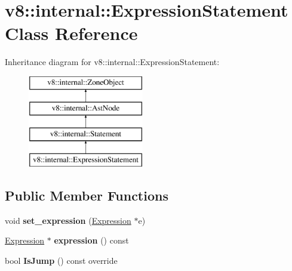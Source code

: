 \hypertarget{classv8_1_1internal_1_1_expression_statement}{}\section{v8\+:\+:internal\+:\+:Expression\+Statement Class Reference}
\label{classv8_1_1internal_1_1_expression_statement}
Inheritance diagram for v8\+:\+:internal\+:\+:Expression\+Statement\+:\begin{figure}[H]
\begin{center}
\leavevmode
\includegraphics[height=4.000000cm]{classv8_1_1internal_1_1_expression_statement}
\end{center}
\end{figure}
\subsection*{Public Member Functions}
\begin{DoxyCompactItemize}
\item 
void {\bfseries set\+\_\+expression} (\hyperlink{classv8_1_1internal_1_1_expression}{Expression} $\ast$e)\hypertarget{classv8_1_1internal_1_1_expression_statement_a38f6198429fb2be06a092e53d458d977}{}\label{classv8_1_1internal_1_1_expression_statement_a38f6198429fb2be06a092e53d458d977}

\item 
\hyperlink{classv8_1_1internal_1_1_expression}{Expression} $\ast$ {\bfseries expression} () const \hypertarget{classv8_1_1internal_1_1_expression_statement_a7569e12172e0abff35261d62149a1934}{}\label{classv8_1_1internal_1_1_expression_statement_a7569e12172e0abff35261d62149a1934}

\item 
bool {\bfseries Is\+Jump} () const  override\hypertarget{classv8_1_1internal_1_1_expression_statement_a3a1c12a6b749eb247fe7157d6237b3d4}{}\label{classv8_1_1internal_1_1_expression_statement_a3a1c12a6b749eb247fe7157d6237b3d4}

\end{DoxyCompactItemize}
